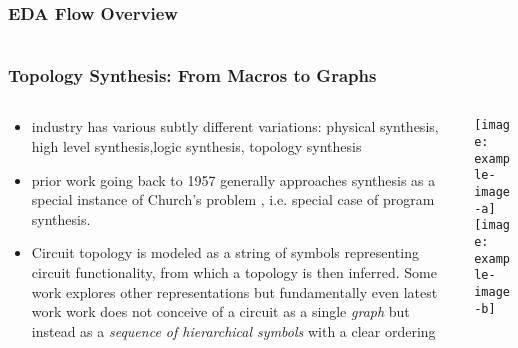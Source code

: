 \documentclass[./presentation.tex]{subfiles}
\begin{document}
\begin{frame}[label=maybedone]
\frametitle{EDA Flow Overview}
  \begin{columns}
    \begin{column}{0.5\textwidth}
      \centering
      \resizebox{!}{0.8\textheight}{
      
    }
    \end{column}
    \begin{column}{0.5\textwidth}
      \centering
    \resizebox{\columnwidth}{!}{%
      
    }
    \end{column}
  \end{columns}
\end{frame}

\begin{frame}[label=todo]
\frametitle{Topology Synthesis: From Macros to Graphs}
\begin{columns}
  {\small
  \begin{column}{0.5\textwidth}
   \begin{itemize}
     \item industry has various subtly different variations: physical synthesis, high level synthesis,logic synthesis, topology synthesis\\
     \item prior work going back to 1957 generally approaches synthesis as a special instance of Church's problem \cite{churchApplicationRecursiveArithmetic1963}, i.e. special case of program synthesis.
     \item Circuit topology is modeled as a string of symbols representing circuit functionality, from which a topology is then inferred. Some work explores other representations \cite{rojecAnalogCircuitTopology2018} but fundamentally even latest work \cite{fayaziAnGeLFullyAutomatedAnalog2023a,dasilvaAutoTGReinforcementLearningBased2023,fanSpecificationTopologyAutomatic2021f,zhaoAutomatedTopologySynthesis2022a} work does not conceive of a circuit as a single \emph{graph} but instead as a \emph{sequence of hierarchical symbols} with a clear ordering
   \end{itemize} 
  \end{column}
}
  \begin{column}{0.5\textwidth}
  \centering
  \texttt{[image: example-image-a]}\\%
  \texttt{[image: example-image-b]}%
  \end{column}
\end{columns}
\end{frame}
\end{document}
